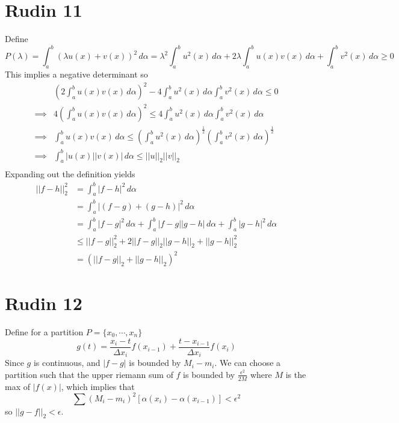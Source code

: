 \documentclass{article}
\begin{document}
\section*{Rudin 11}
Define
\[
	P(\lambda) = \int_a^b (\lambda u(x) + v(x))^2 \,d\alpha
	= \lambda^2 \int_a^b u^2(x)\,d\alpha + 2\lambda \int_a^b u(x)v(x) \,d\alpha + \int_a^b v^2(x)\,d\alpha \geq 0
\]
This implies a negative determinant so 
\begin{align*}
	&\left(2 \int_a^b u(x)v(x) \,d\alpha \right)^2 - 4\int_a^b u^2(x)\,d\alpha  \int_a^b v^2(x)\,d\alpha \leq 0 \\
	\implies& 4\left(\int_a^b u(x)v(x) \,d\alpha \right)^2 \leq 4\int_a^b u^2(x)\,d\alpha  \int_a^b v^2(x)\,d\alpha \\
	\implies & \int_a^b u(x)v(x) \,d\alpha  \leq \left(\int_a^b u^2(x)\,d\alpha\right)^\frac{1}{2}  \left(\int_a^b v^2(x)\,d\alpha\right)^\frac{1}{2}  \\
	\implies & \int_a^b |u(x)||v(x)| \,d\alpha  \leq ||u||_2||v||_2 \\
\end{align*}
Expanding out the definition yields 
\begin{align*}
	||f-h||_2^2 &= \int_a^b |f-h|^2 \,d\alpha \\
	&=\int_a^b |(f-g) + (g-h)|^2 \,d\alpha \\
	&= \int_a^b |f-g|^2 \,d\alpha  + \int_a^b |f-g||g-h| \,d\alpha + \int_a^b |g-h|^2 \,d\alpha\\
	&\leq ||f-g||_2^2 + 2||f-g||_2||g-h||_2 + ||g-h||_2^2 \\
	&= (||f-g||_2 +||g-h||_2)^2
\end{align*}

\section*{Rudin 12}
Define for a partition $P = \{x_0,\cdots,x_n\}$
\[
	g(t) = \frac{x_i-t}{\Delta x_i}f(x_{i-1}) + \frac{t-x_{i-1}}{\Delta x_i}f(x_i) 
\]
Since $g$ is continuous, and $|f-g|$ is bounded by $M_i - m_i$.
We can choose a partition such that the upper riemann sum of $f$ is bounded by $\frac{\epsilon^2}{2M}$
where $M$ is the max of $|f(x)|$,
which implies that 
\[
	\sum (M_i - m_i)^2[\alpha(x_i) - \alpha(x_{i-1})] < \epsilon^2
\]
so $||g-f||_2 < \epsilon$.
\end{document}
